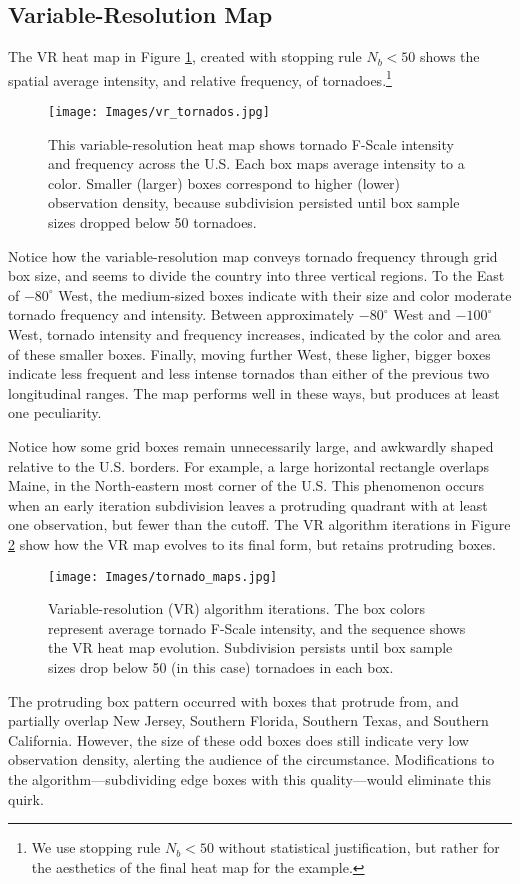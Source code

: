 \subsection{Variable-Resolution Map}

The VR heat map in Figure \ref{fig:tornado1}, created with stopping rule $N_{b} < 50$ shows the spatial average intensity, and relative frequency, of tornadoes.\footnote{We use stopping rule $N_{b} < 50$ without statistical justification, but rather for the aesthetics of the final heat map for the example.}
        \begin{figure}[H]
      	\centering      
      	\texttt{[image: Images/vr\_tornados.jpg]}
      	\caption{This variable-resolution heat map shows tornado F-Scale intensity and frequency across the U.S. Each box maps average intensity to a color. Smaller (larger) boxes correspond to higher (lower) observation density, because subdivision persisted until box sample sizes dropped below 50 tornadoes.}
      	\label{fig:tornado1}
        \end{figure}
Notice how the variable-resolution map conveys tornado frequency through grid box size, and seems to divide the country into three vertical regions. To the East of $-80^{\circ}$ West, the medium-sized boxes indicate with their size and color moderate tornado frequency and intensity. Between approximately $-80^{\circ}$ West and $-100^{\circ}$ West, tornado intensity and frequency increases, indicated by the color and area of these smaller boxes. Finally, moving further West, these ligher, bigger boxes indicate less frequent and less intense tornados than either of the previous two longitudinal ranges. The map performs well in these ways, but produces at least one peculiarity.

Notice how some grid boxes remain unnecessarily large, and awkwardly shaped relative to the U.S. borders. For example, a large horizontal rectangle overlaps Maine, in the North-eastern most corner of the U.S. This phenomenon occurs when an early iteration subdivision leaves a protruding quadrant with at least one observation, but fewer than the cutoff. The VR algorithm iterations in Figure \ref{fig:tornado2} show how the VR map evolves to its final form, but retains protruding boxes.
        \begin{figure}[H]
      	\centering      
      	\texttt{[image: Images/tornado\_maps.jpg]}
      	\caption{Variable-resolution (VR) algorithm iterations. The box colors represent average tornado F-Scale intensity, and the sequence shows the VR heat map evolution. Subdivision persists until box sample sizes drop below 50 (in this case) tornadoes in each box.}
      	\label{fig:tornado2}
        \end{figure}
The protruding box pattern occurred with boxes that protrude from, and partially overlap New Jersey, Southern Florida, Southern Texas, and Southern California. However, the size of these odd boxes does still indicate very low observation density, alerting the audience of the circumstance. Modifications to the algorithm---subdividing edge boxes with this quality---would eliminate this quirk.

